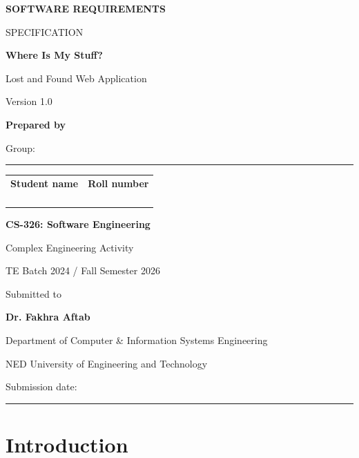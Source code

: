 \documentclass[12pt,a4paper,oneside]{report}
\newcommand{\GroupName}{\rule{7cm}{0.35pt}}
\newcommand{\SubmissionDate}{\rule{4cm}{0.35pt}}
\begin{document}
\fontsize{11}{13.2}\selectfont
\begin{titlepage}
\centering
{\color{ink}\bfseries\LARGE SOFTWARE REQUIREMENTS\par SPECIFICATION\par}
\vspace{1.1cm}
{\color{ink}\bfseries\Huge Where Is My Stuff?\par}
\vspace{0.35cm}
{\Large Lost and Found Web Application\par}
\vspace{0.4cm}
{\large Version 1.0\par}
\vspace{1.2cm}
{\bfseries Prepared by\par}\vspace{0.3cm}
Group: \GroupName\par\vspace{0.3cm}
\begin{tabular}{p{7cm}p{4cm}}
\textbf{Student name} & \textbf{Roll number}\\[15pt]
\hrulefill & \hrulefill\\[19pt]
\hrulefill & \hrulefill\\[19pt]
\hrulefill & \hrulefill\\[19pt]
\hrulefill & \hrulefill
\end{tabular}
\vfill
{\bfseries CS-326: Software Engineering\par}
Complex Engineering Activity\par
TE Batch 2024 / Fall Semester 2026\par
\vspace{0.6cm}
Submitted to\par
{\large\bfseries Dr. Fakhra Aftab\par}
\vspace{0.7cm}
Department of Computer \& Information Systems Engineering\par
NED University of Engineering and Technology\par
\vspace{0.6cm}
Submission date: \SubmissionDate\par
\end{titlepage}
\tableofcontents
\clearpage
\listoffigures
\clearpage
{}
\setcounter{page}{1}

\chapter{Introduction}
\end{document}
